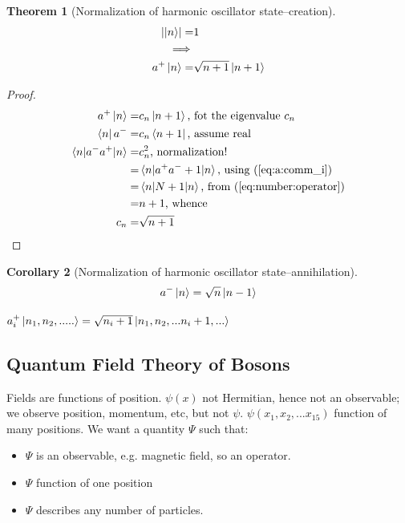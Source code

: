 \documentclass[]{article}
\newtheorem{thm}{Theorem}
\newtheorem{cor}[thm]{Corollary}
\begin{document}
\begin{thm}[Normalization of harmonic oscillator state--creation]\label{thm:norm:harmonic}
	\begin{align*}
	\left|\ket{n}\right|=&1\\
	\implies&\\
	a^+\ket{n}=&\sqrt{n+1}\ket{n+1}
	\end{align*}
\end{thm} 

\begin{proof}
	\begin{align*}
	a^+\ket{n}=&c_n\ket{n+1} \text{, fot the eigenvalue $c_n$}\\
	\bra{n}a^-=&c_n\bra{n+1}\text{, assume real}\\
	\braket{n|a^-a^+|n}=&c_n^2\text{, normalization!}\\
	=& \braket{n|a^+a^-+1|n}\text{, using (\ref{eq:a:comm_i})}\\
	=& \braket{n|N+1|n} \text{, from (\ref{eq:number:operator})}\\
	=&n+1 \text{, whence}\\
	c_n=&\sqrt{n+1}
	\end{align*}
\end{proof}

\begin{cor}[Normalization of harmonic oscillator state--annihilation]
	\begin{align*}
	a^-\ket{n}=\sqrt{n}\ket{n-1}
	\end{align*}
\end{cor}


$a_i^+\ket{n_1,n_2,.....}=\sqrt{n_i+1}\ket{n_1,n_2,...n_i+1,...}$

\subsection{Quantum Field Theory of Bosons}

Fields are functions of position. $\psi(x)$ not Hermitian, hence not an observable; we observe position, momentum, etc, but not $\psi$. $\psi(x_1,x_2,...x_{15})$ function of many positions. We want a quantity $\Psi$ such that:

\begin{itemize}
	\item $\Psi$ is an observable, e.g. magnetic field, so an operator.
	\item $\Psi$ function of one position
	\item $\Psi$ describes any number of particles.
\end{itemize}
\end{document}

